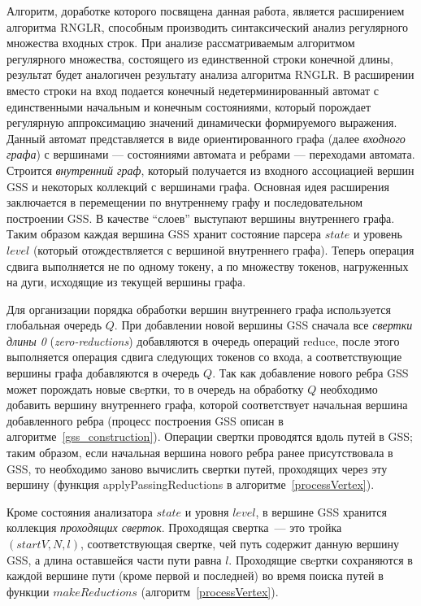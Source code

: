 Алгоритм, доработке которого посвящена данная работа, является расширением алгоритма RNGLR, способным производить синтаксический анализ регулярного множества входных строк. При анализе рассматриваемым алгоритмом регулярного множества, состоящего из единственной строки конечной длины, результат будет аналогичен результату анализа алгоритма RNGLR. В расширении вместо строки на вход подается конечный недетерминированный автомат с единственными начальным и конечным состояниями, который порождает регулярную аппроксимацию значений динамически формируемого выражения. Данный автомат представляется в виде ориентированного графа (далее \emph{входного графа}) с вершинами --- состояниями автомата и ребрами --- переходами автомата. Строится \emph{внутренний граф}, который получается из входного ассоциацией вершин GSS и некоторых коллекций с вершинами графа. Основная идея расширения заключается в перемещении по внутреннему графу и последовательном построении GSS. В качестве ``слоев'' выступают вершины внутреннего графа. Таким образом каждая вершина GSS хранит состояние парсера $state$ и уровень $level$ (который отождествляется с вершиной внутреннего графа). Теперь операция сдвига выполняется не по одному токену, а по множеству токенов, нагруженных на дуги, исходящие из текущей вершины графа.

Для организации порядка обработки вершин внутреннего графа используется глобальная очередь $Q$. При добавлении новой вершины GSS сначала все \emph{свертки длины 0} (\emph{zero-reductions}) добавляются в очередь операций reduce, после этого выполняется операция сдвига следующих токенов со входа, а соответствующие вершины графа добавляются в очередь $Q$. Так как добавление нового ребра GSS может порождать новые свeртки, то в очередь на обработку $Q$ необходимо добавить вершину внутреннего графа, которой соответствует начальная вершина добавленного ребра (процесс построения GSS описан в алгоритме~\ref{gss_construction}). Операции свертки проводятся вдоль путей в GSS; таким образом, если начальная вершина нового ребра ранее присутствовала в GSS, то необходимо заново вычислить свертки путей, проходящих через эту вершину (функция applyPassingReductions в алгоритме~\ref{processVertex}).

Кроме состояния анализатора $state$ и уровня $level$, в вершине GSS хранится коллекция \emph{проходящих сверток}. Проходящая свертка~--- это тройка $(startV, N, l)$, соответствующая свертке, чей путь содержит данную вершину GSS, а длина оставшейся части пути равна $l$. Проходящие свeртки сохраняются в каждой вершине пути (кроме первой и последней) во время поиска путей в функции $makeReductions$ (алгоритм~\ref{processVertex}).

